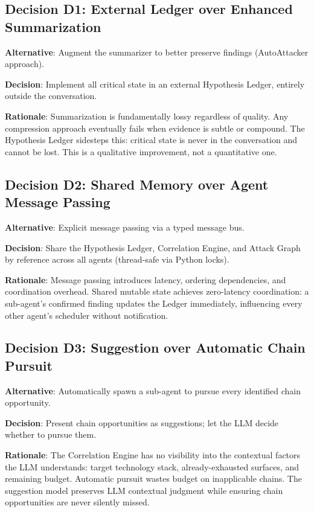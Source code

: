 \documentclass[12pt,a4paper,oneside,openany]{book}
\begin{document}
\subsection{Decision D1: External Ledger over Enhanced Summarization}

\textbf{Alternative}: Augment the summarizer to better preserve findings (AutoAttacker approach).

\textbf{Decision}: Implement all critical state in an external Hypothesis Ledger, entirely outside the conversation.

\textbf{Rationale}: Summarization is fundamentally lossy regardless of quality. Any compression approach eventually fails when evidence is subtle or compound. The Hypothesis Ledger sidesteps this: critical state is never in the conversation and cannot be lost. This is a qualitative improvement, not a quantitative one.

\subsection{Decision D2: Shared Memory over Agent Message Passing}

\textbf{Alternative}: Explicit message passing via a typed message bus.

\textbf{Decision}: Share the Hypothesis Ledger, Correlation Engine, and Attack Graph by reference across all agents (thread-safe via Python locks).

\textbf{Rationale}: Message passing introduces latency, ordering dependencies, and coordination overhead. Shared mutable state achieves zero-latency coordination: a sub-agent's confirmed finding updates the Ledger immediately, influencing every other agent's scheduler without notification.

\subsection{Decision D3: Suggestion over Automatic Chain Pursuit}

\textbf{Alternative}: Automatically spawn a sub-agent to pursue every identified chain opportunity.

\textbf{Decision}: Present chain opportunities as suggestions; let the LLM decide whether to pursue them.

\textbf{Rationale}: The Correlation Engine has no visibility into the contextual factors the LLM understands: target technology stack, already-exhausted surfaces, and remaining budget. Automatic pursuit wastes budget on inapplicable chains. The suggestion model preserves LLM contextual judgment while ensuring chain opportunities are never silently missed.
\end{document}
